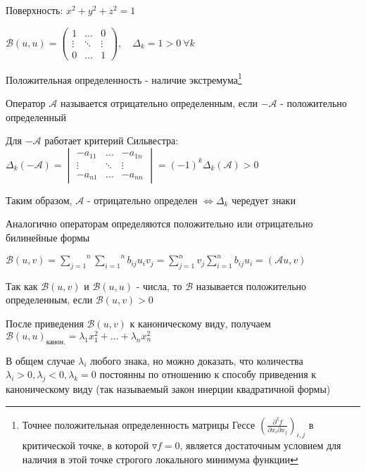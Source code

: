 \documentclass[12pt]{article}
\begin{document}
    \Ex Поверхность: $x^2 + y^2 + z^2 = 1$

    $\mathcal{B}(u, u) = \begin{pmatrix}1 & \dots & 0 \\ \vdots & \ddots & \vdots \\ 0 & \dots & 1\end{pmatrix},
    \quad \Delta_k = 1 > 0 \ \forall k$

    Положительная определенность - наличие экстремума\footnote{Точнее положительная определенность матрицы Гессе $\left(\frac{\partial^2 f}{\partial x_i \partial x_j}\right)_{i,j}$ в критической точке, в которой $\triangledown f = 0$, является достаточным условием для наличия в этой точке строгого локального минимума функции}

    \Def Оператор $\mathcal{A}$ называется отрицательно определенным, если $-\mathcal{A}$ - положительно определенный

    \Notas Для $-\mathcal{A}$ работает критерий Сильвестра: $\Delta_k(-\mathcal{A}) =
    \begin{vmatrix}-a_{11} & \dots & -a_{1n} \\ \vdots & \ddots & \vdots \\ -a_{n1} & \dots & -a_{nn}\end{vmatrix} = (-1)^k \Delta_k (\mathcal{A}) > 0$

    Таким образом, $\mathcal{A}$ - отрицательно определен $\Longleftrightarrow \Delta_k$ чередует знаки

    \Nota Аналогично операторам определяются положительно или отрицательно билинейные формы

    $\mathcal{B}(u, v) = \overset{n}{\underset{j = 1}{\sum}}\overset{n}{\underset{i = 1}{\sum}} b_{ij} u_i v_j = \sum_{j = 1}^n v_j \sum_{i = 1}^n b_{ij} u_i = (\mathcal{A} u, v)$

    Так как $\mathcal{B}(u, v)$ и  $\mathcal{B}(u, u)$ - числа, то $\mathcal{B}$ называется положительно определенным, если $\mathcal{B}(u, v) > 0$

    \Nota После приведения $\mathcal{B}(u, v)$ к каноническому виду, получаем $\mathcal{B}(u, u)_{\text{канон.}} = \lambda_1 x_1^2 + \dots + \lambda_n x_n^2$

    В общем случае $\lambda_i$ любого знака, но можно доказать, что количества $\lambda_i > 0, \lambda_j < 0, \lambda_k = 0$ постоянны по отношению к способу приведения
    к каноническому виду (так называемый закон инерции квадратичной формы)
\end{document}
